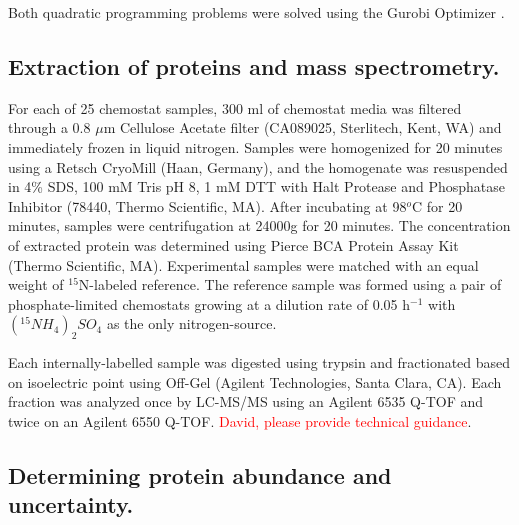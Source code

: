 Both quadratic programming problems were solved using the Gurobi Optimizer \cite{Anonymous:WfN-MQJY}.

\subsection{Extraction of proteins and mass spectrometry.}

For each of 25 chemostat samples, 300 ml of chemostat media was filtered through a 0.8 $\mu$m Cellulose Acetate filter (CA089025, Sterlitech, Kent, WA) and immediately frozen in liquid nitrogen.  Samples were homogenized for 20 minutes using a Retsch CryoMill (Haan, Germany), and the homogenate was resuspended in 4\% SDS, 100 mM Tris pH 8, 1 mM DTT with Halt Protease and Phosphatase Inhibitor (78440, Thermo Scientific, MA).  After incubating at 98$^{o}$C for 20 minutes, samples were centrifugation at 24000g for 20 minutes.  The concentration of extracted protein was determined using Pierce BCA Protein Assay Kit (Thermo Scientific, MA).  Experimental samples were matched with an equal weight of $^{15}$N-labeled reference.  The reference sample was formed using a pair of phosphate-limited chemostats growing at a dilution rate of 0.05 h$^{-1}$ with $(^{15}NH_{4})_{2}SO_{4}$ as the only nitrogen-source.

Each internally-labelled sample was digested using trypsin and fractionated based on isoelectric point using Off-Gel (Agilent Technologies, Santa Clara, CA). Each fraction was analyzed once by LC-MS/MS using an Agilent 6535 Q-TOF and twice on an Agilent 6550 Q-TOF.  \textcolor{red}{David, please provide technical guidance}.

\subsection{Determining protein abundance and uncertainty.}

